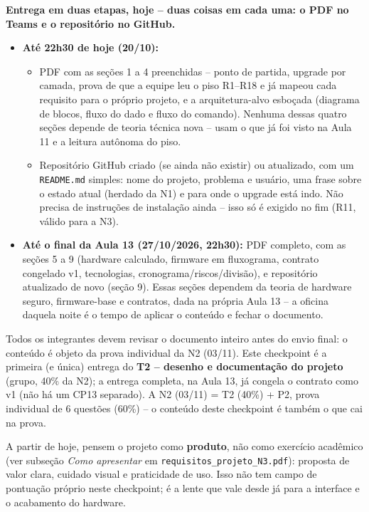 \documentclass[11pt,a4paper]{article}
\newcommand{\cod}[1]{\texttt{#1}}
\begin{document}
\textbf{Entrega em duas etapas, hoje -- duas coisas em cada uma: o PDF no Teams e o
repositório no GitHub.}

\begin{itemize}
\item \textbf{Até 22h30 de hoje (20/10):}
  \begin{itemize}[label=--]
  \item PDF com as seções 1 a 4 preenchidas -- ponto de partida, upgrade por camada,
    prova de que a equipe leu o piso R1--R18 e já mapeou cada requisito para o próprio
    projeto, e a arquitetura-alvo esboçada (diagrama de blocos, fluxo do dado e fluxo
    do comando). Nenhuma dessas quatro seções depende de teoria técnica nova --
    usam o que já foi visto na Aula 11 e a leitura autônoma do piso.
  \item Repositório GitHub criado (se ainda não existir) ou atualizado, com um \cod{README.md}
    simples: nome do projeto, problema e usuário, uma frase sobre o estado atual
    (herdado da N1) e para onde o upgrade está indo. Não precisa de instruções de
    instalação ainda -- isso só é exigido no fim (R11, válido para a N3).
  \end{itemize}
\item \textbf{Até o final da Aula 13 (27/10/2026, 22h30):} PDF completo, com as seções 5
  a 9 (hardware calculado, firmware em fluxograma, contrato congelado v1, tecnologias,
  cronograma/riscos/divisão), e repositório atualizado de novo (seção 9). Essas seções
  dependem da teoria de hardware seguro, firmware-base e contratos, dada na própria
  Aula 13 -- a oficina daquela noite é o tempo de aplicar o conteúdo e fechar o documento.
\end{itemize}

Todos os integrantes devem revisar o documento inteiro antes do envio final: o conteúdo é
objeto da prova individual da N2 (03/11). Este checkpoint é a primeira (e única) entrega do
\textbf{T2 -- desenho e documentação do projeto} (grupo, 40\% da N2); a entrega completa, na Aula
13, já congela o contrato como v1 (não há um CP13 separado). A N2 (03/11) = T2 (40\%) +
P2, prova individual de 6 questões (60\%) -- o conteúdo deste checkpoint é também o que cai
na prova.

A partir de hoje, pensem o projeto como \textbf{produto}, não como exercício acadêmico (ver subseção
\textit{Como apresentar} em \cod{requisitos\_projeto\_N3.pdf}): proposta de valor clara, cuidado
visual e praticidade de uso. Isso não tem campo de pontuação próprio neste checkpoint; é a
lente que vale desde já para a interface e o acabamento do hardware.
\end{document}
